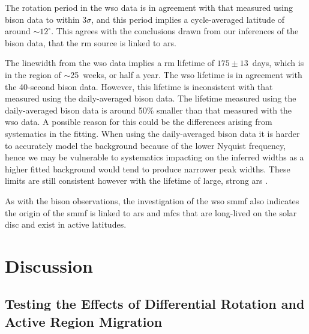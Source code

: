 The rotation period in the \gls{wso} data is in agreement with that measured using \gls{bison} data to within 3$\sigma$, and this period implies a cycle-averaged latitude of around $\sim12^{\circ}$. This agrees with the conclusions drawn from our inferences of the \gls{bison} data, that the \gls{rm} source is linked to \glspl{ar}.


The linewidth from the \gls{wso} data implies a \gls{rm} lifetime of $175 \pm 13$~days, which is in the region of $\sim$25~weeks, or half a year. The \gls{wso} lifetime is in agreement with the 40-second \gls{bison} data. However, this lifetime is inconsistent with that measured using the daily-averaged \gls{bison} data. The lifetime measured using the daily-averaged \gls{bison} data is around 50\% smaller than that measured with the \gls{wso} data. A possible reason for this could be the differences arising from systematics in the fitting. When using the daily-averaged \gls{bison} data it is harder to accurately model the background because of the lower Nyquist frequency, hence we may be vulnerable to systematics impacting on the inferred widths as a higher fitted background would tend to produce narrower peak widths. %
These limits are still consistent however with the lifetime of large, strong \glspl{ar} \citep{schrijver_photospheric_1994, van_driel-gesztelyi_evolution_2015}. 

As with the \gls{bison} observations, the investigation of the \gls{wso} \gls{smmf} also indicates the origin of the \gls{smmf} is linked to \glspl{ar} and \glspl{mfc} that are long-lived on the solar disc and exist in active latitudes.



\section{Discussion}\label{sec:SMMF_artificial}



\subsection{Testing the Effects of Differential Rotation and Active Region Migration}
\label{sec:smearing}

